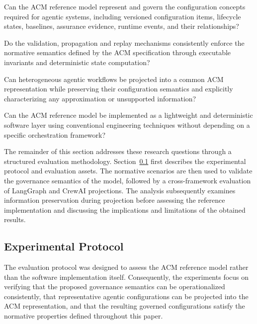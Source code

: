 \documentclass[10pt]{article}
\begin{document}
\begin{description}[leftmargin=1.2cm,style=nextline]

\item[\textbf{RQ1. Model Expressiveness}]
Can the ACM reference model represent and govern the configuration concepts required for agentic systems, including versioned configuration items, lifecycle states, baselines, assurance evidence, runtime events, and their relationships?

\item[\textbf{RQ2. Governance Consistency}]
Do the validation, propagation and replay mechanisms consistently enforce the normative semantics defined by the ACM specification through executable invariants and deterministic state computation?

\item[\textbf{RQ3. Cross-Framework Portability}]
Can heterogeneous agentic workflows be projected into a common ACM representation while preserving their configuration semantics and explicitly characterizing any approximation or unsupported information?

\item[\textbf{RQ4. Implementation Feasibility}]
Can the ACM reference model be implemented as a lightweight and deterministic software layer using conventional engineering techniques without depending on a specific orchestration framework?

\end{description}

The remainder of this section addresses these research questions through a structured evaluation methodology. Section~\ref{sec:experimental_protocol} first describes the experimental protocol and evaluation assets. The normative scenarios are then used to validate the governance semantics of the model, followed by a cross-framework evaluation of LangGraph and CrewAI projections. The analysis subsequently examines information preservation during projection before assessing the reference implementation and discussing the implications and limitations of the obtained results.

\subsection{Experimental Protocol}
\label{sec:experimental_protocol}

The evaluation protocol was designed to assess the ACM reference model rather than the software implementation itself. Consequently, the experiments focus on verifying that the proposed governance semantics can be operationalized consistently, that representative agentic configurations can be projected into the ACM representation, and that the resulting governed configurations satisfy the normative properties defined throughout this paper.
\end{document}
